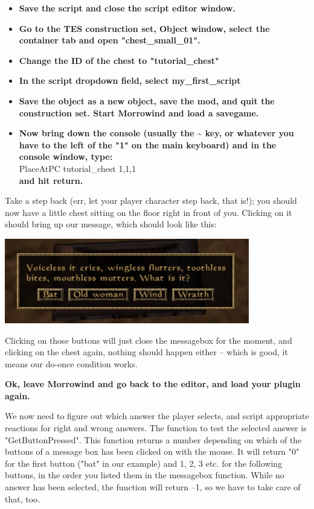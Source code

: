 \begin{itemize}
\item
  \textbf{Save the script and close the script editor window.}
\item
  \textbf{Go to the TES construction set, Object window, select the
  container tab and open "chest\_small\_01".}
\item
  \textbf{Change the ID of the chest to "tutorial\_chest"}
\item
  \textbf{In the script dropdown field, select my\_first\_script}
\item
  \textbf{Save the object as a new object, save the mod, and quit the
  construction set. Start Morrowind and load a savegame.}
\item
  \textbf{Now bring down the console (usually the \textasciitilde{} key,
  or whatever you have to the left of the "1" on the main keyboard) and
  in the console window, type:}\\
  PlaceAtPC tutorial\_chest 1,1,1\\
  \textbf{and hit return.}
\end{itemize}

Take a step back (err, let your player character step back, that is!); you should now have a little chest sitting on the floor right in front of you. Clicking on it should bring up our message, which should look like this:

\includegraphics{media/image3.png}

Clicking on those buttons will just close the messagebox for the moment, and clicking on the chest again, nothing should happen either -- which is good, it means our do-once condition works.

\textbf{Ok, leave Morrowind and go back to the editor, and load your plugin again.}

We now need to figure out which answer the player selects, and script appropriate reactions for right and wrong answers. The function to test the selected answer is "GetButtonPressed". This function returns a number depending on which of the buttons of a message box has been clicked on with the mouse. It will return "0" for the first button ("bat" in our example) and 1, 2, 3 etc. for the following buttons, in the order you listed them in the messagebox function. While no answer
has been selected, the function will return --1, so we have to take care of that, too.

